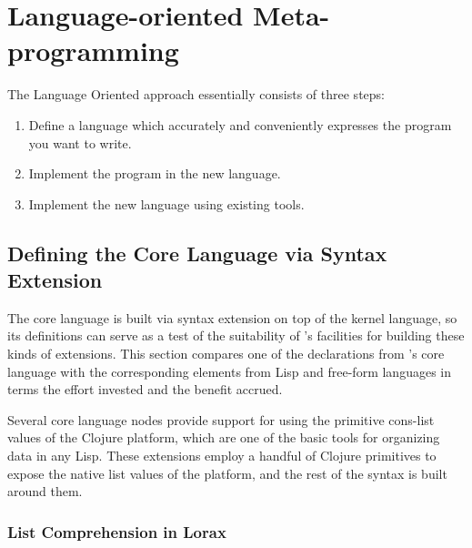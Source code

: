 \section{Language-oriented Meta-programming}
\label{studies}

The Language Oriented\cite{ward} approach essentially consists of three steps:
\begin{enumerate}
\item Define a language which accurately and conveniently expresses the program you want to write.
\item Implement the program in the new language.
\item Implement the new language using existing tools.
\end{enumerate}


%
%
\subsection{Defining the Core Language via Syntax Extension}
\label{for}
The core language is built via syntax extension on top of the kernel language, so its definitions can serve as a test of the suitability of \Meta's  facilities for building these kinds of extensions. This section compares one of the declarations from \Meta's core language with the corresponding elements from Lisp and free-form languages in terms the effort invested and the benefit accrued.

Several core language nodes provide support for using the primitive cons-list values of the Clojure platform, which are one of the basic tools for organizing data in any Lisp. These extensions employ a handful of Clojure primitives to expose the native list values of the platform, and the rest of the syntax is built around them.


\subsubsection{List Comprehension in Lorax}

